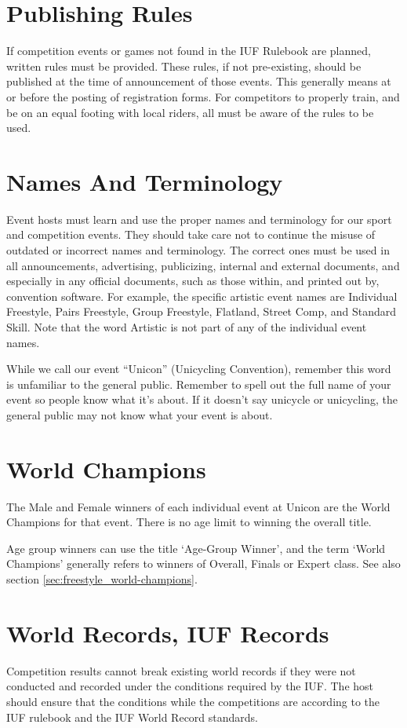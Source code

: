 \section{Publishing Rules}
If competition events or games not found in the IUF Rulebook are planned, written rules must be provided. 
These rules, if not pre-existing, should be published at the time of announcement of those events. 
This generally means at or before the posting of registration forms. 
For competitors to properly train, and be on an equal footing with local riders, all must be aware of the rules to be used.

\section{Names And Terminology}
Event hosts must learn and use the proper names and terminology for our sport and competition events. 
They should take care not to continue the misuse of outdated or incorrect names and terminology. 
The correct ones must be used in all announcements, advertising, publicizing, internal and external documents, and especially in any official documents, such as those within, and printed out by, convention software. 
For example, the specific artistic event names are Individual Freestyle, Pairs Freestyle, Group Freestyle, Flatland, Street Comp, and Standard Skill. 
Note that the word Artistic is not part of any of the individual event names.

While we call our event ``Unicon'' (Unicycling Convention), remember this word is unfamiliar to the general public. 
Remember to spell out the full name of your event so people know what it's about. 
If it doesn't say unicycle or unicycling, the general public may not know what your event is about.

\section{World Champions}
The Male and Female winners of each individual event at Unicon are the World Champions for that event. 
There is no age limit to winning the overall title.

Age group winners can use the title `Age-Group Winner', and the term `World Champions' generally refers to winners of Overall, Finals or Expert class. 
See also section \ref{sec:freestyle_world-champions}.


\section{World Records, IUF Records}
Competition results cannot break existing world records if they were not conducted and recorded under the conditions required by the IUF.
The host should ensure that the conditions while the competitions are according to the IUF rulebook and the IUF World Record standards.

